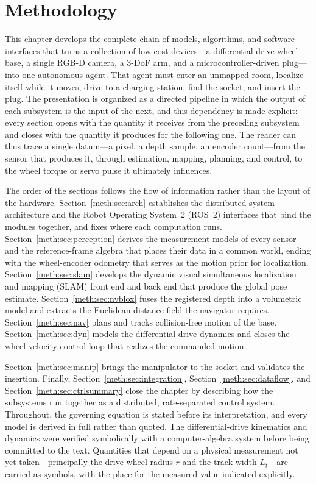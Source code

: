 \section{Methodology}\label{meth:ch:method}

This chapter develops the complete chain of models, algorithms, and software interfaces that turns a collection of low-cost devices---a differential-drive wheel base, a single RGB-D camera, a 3-DoF arm, and a microcontroller-driven plug---into one autonomous agent. That agent must enter an unmapped room, localize itself while it moves, drive to a charging station, find the socket, and insert the plug. The presentation is organized as a directed pipeline in which the output of each subsystem is the input of the next, and this dependency is made explicit: every section opens with the quantity it receives from the preceding subsystem and closes with the quantity it produces for the following one. The reader can thus trace a single datum---a pixel, a depth sample, an encoder count---from the sensor that produces it, through estimation, mapping, planning, and control, to the wheel torque or servo pulse it ultimately influences.

The order of the sections follows the flow of information rather than the layout of the hardware. Section~\ref{meth:sec:arch} establishes the distributed system architecture and the Robot Operating System~2 (ROS~2) interfaces that bind the modules together, and fixes where each computation runs. Section~\ref{meth:sec:perception} derives the measurement models of every sensor and the reference-frame algebra that places their data in a common world, ending with the wheel-encoder odometry that serves as the motion prior for localization. Section~\ref{meth:sec:slam} develops the dynamic visual simultaneous localization and mapping (SLAM) front end and back end that produce the global pose estimate. Section~\ref{meth:sec:nvblox} fuses the registered depth into a volumetric model and extracts the Euclidean distance field the navigator requires. Section~\ref{meth:sec:nav} plans and tracks collision-free motion of the base. Section~\ref{meth:sec:dyn} models the differential-drive dynamics and closes the wheel-velocity control loop that realizes the commanded motion.

Section~\ref{meth:sec:manip} brings the manipulator to the socket and validates the insertion. Finally, Section~\ref{meth:sec:integration}, Section~\ref{meth:sec:dataflow}, and Section~\ref{meth:sec:ctrlsummary} close the chapter by describing how the subsystems run together as a distributed, rate-separated control system. Throughout, the governing equation is stated before its interpretation, and every model is derived in full rather than quoted. The differential-drive kinematics and dynamics were verified symbolically with a computer-algebra system before being committed to the text. Quantities that depend on a physical measurement not yet taken---principally the drive-wheel radius $r$ and the track width $L_t$---are carried as symbols, with the place for the measured value indicated explicitly.

